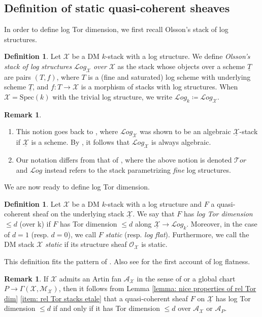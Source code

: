 \documentclass[11pt]{amsart}
\theoremstyle{definition}
\theoremstyle{definition}
\newtheorem{remark}[theorem]{Remark}
\newtheorem{definition}[theorem]{Definition}
\newcommand{\cL}{\mathcal{L}}
\newcommand{\cT}{\mathcal{T}}
\newcommand{\cX}{\mathcal{X}}
\newcommand{\ul}[1]{\underline{#1}}
\newcommand{\cal}{\mathcal}
\def\cL{{\cal L}}
\def\cT{{\cal T}}
\def\cX{{\cal X}}
\begin{document}
\subsection{Definition of static quasi-coherent sheaves}
In order to define log Tor dimension, we first recall Olsson's stack of log structures.
\begin{definition}
    Let $\cX$ be a DM $k$-stack with a log structure. We define \textit{Olsson's stack of log structures} $\cL og_{\cX}$ \textit{over} $\cX$ as the stack whose objects over a scheme $\ul{T}$ are pairs $(T, f)$, where $T$ is a (fine and saturated) log scheme with underlying scheme $\ul{T}$, and $f \colon T \to \cX$ is a morphism of stacks with log structures. When $\cX=\text{Spec}(k)$ with the trivial log structure, we write $\cL og_{k}\coloneqq \cL og_{\cX}$.
\end{definition}
\begin{remark}
    \begin{enumerate}
        \item This notion goes back to \cite{log-geometry-and-algebraic-stacks}, where $\cL og_{\cX}$ was shown to be an algebraic $\ul{\cX}$-stack if $\ul{\cX}$ is a scheme. By \cite[Exercise 10.A]{Algebraic-spaces-and-stacks}, it follows that $\cL og_{\cX}$ is always algebraic.
        \item Our notation differs from that of \cite{log-geometry-and-algebraic-stacks}, where the above notion is denoted $\cT or$ and $\cL og$ instead refers to the stack parametrizing \textit{fine} log structures.
    \end{enumerate}
\end{remark}
We are now ready to define log Tor dimension.
\begin{definition}\label{definition: log Tor dimension}
Let $\mathcal{X}$ be a DM $k$-stack with a log structure and $F$ a quasi-coherent sheaf on the underlying stack $\underline{\mathcal{X}}$. We say that $F$ has \emph{log Tor dimension $\leq d$} (over k) if $F$ has Tor dimension $\leq d$ along $\underline{\mathcal{X}}\rightarrow \mathcal{L}og_{k}$.
Moreover, in the case of $d=1$ (resp. $d=0$), we call $F$ \emph{static} (resp. \emph{log flat}). Furthermore, we call the DM stack $\mathcal{X}$ \textit{static} if its structure sheaf $\mathcal{O}_{\mathcal{X}}$ is static.
\end{definition}
This definition fits the pattern of \cite[Definition 4.1]{log-geometry-and-algebraic-stacks}. Also see \cite{gillam2016logarithmicflatness} for the first account of log flatness.
\begin{remark}\label{remark-on-reduction-on-artin-fan-log-Tor dimension}
If $\mathcal{X}$ admits an Artin fan $\mathcal{A}_\mathcal{X}$ in the sense of \cite{AWbirational} or a global chart $P\rightarrow \Gamma(\mathcal{X},\mathcal{M}_\mathcal{X})$, then it follows from Lemma \ref{lemma: nice properties of rel Tor dim} \eqref{item: rel Tor stacks etale} that a quasi-coherent sheaf $F$ on $\ul{\mathcal{X}}$ has log Tor dimension $\leq d$ if and only if it has Tor dimension $\leq d$ over $\mathcal{A}_\mathcal{X}$ or $\mathcal{A}_P$.
\end{remark}
\end{document}
